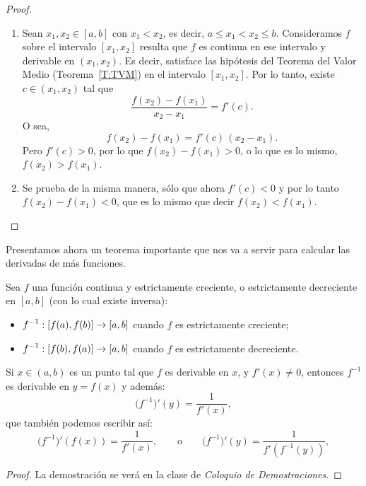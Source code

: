 \begin{proof}
    \begin{enumerate}
        \item Sean $x_1,x_2\in[a,b]$ con $x_1<x_2$, es decir, $a\le x_1<x_2\le b$. Consideramos $f$ sobre el intervalo $[x_1,x_2]$ resulta que $f$ es continua en ese intervalo y derivable en $(x_1,x_2)$. Es decir, satisface las hipótesis del Teorema del Valor Medio (Teorema~\ref{T:TVM}) en el intervalo $[x_1,x_2]$.
        Por lo tanto, existe $c\in(x_1,x_2)$ tal que 
        \[
        \frac{f(x_2)-f(x_1)}{x_2-x_1} = f'(c).
        \]
        O sea,
        \[
        f(x_2)-f(x_1) = f'(c)\, (x_2-x_1).
        \]
        Pero $f'(c)>0$, por lo que $f(x_2)-f(x_1)>0$, o lo que es lo mismo, $f(x_2)>f(x_1)$.
        
        \item Se prueba de la misma manera, sólo que ahora $f'(c)<0$ y por lo tanto $f(x_2)-f(x_1)<0$, que es lo mismo que decir $f(x_2)<f(x_1)$.
    \end{enumerate}
\end{proof}

Presentamos ahora un teorema importante que nos va a servir para calcular las derivadas de más funciones.

\begin{theorem}
    Sea $f$ una función continua y estrictamente creciente, o estrictamente decreciente en $[a,b]$ (con lo cual existe inversa):
    \begin{itemize}
        \item $\displaystyle f^{-1}:[f(a),f(b)]\to [a,b]$ cuando $f$ es estrictamente creciente;
        \item $\displaystyle f^{-1}:[f(b),f(a)]\to [a,b]$ cuando $f$ es estrictamente decreciente.
    \end{itemize}
    Si $x\in(a,b)$ es un punto tal que $f$ es derivable en $x$, y $f'(x)\neq 0$, entonces $f^{-1}$ es derivable en $y=f(x)$ y además:
    \[
    \big(f^{-1}\big)'(y) = \frac1{f'(x)},
    \]
    que también podemos escribir así:
    \begin{equation}\label{eq:derivada inversa}
    \big(f^{-1}\big)'(f(x)) = \frac1{f'(x)},
    \qquad\text{o}\qquad
    \big(f^{-1}\big)'(y) = \frac1{f'(f^{-1}(y))},
    \end{equation}
\end{theorem}

\begin{proof}
    La demostración se verá en la clase de \emph{Coloquio de Demostraciones}.
\end{proof}

